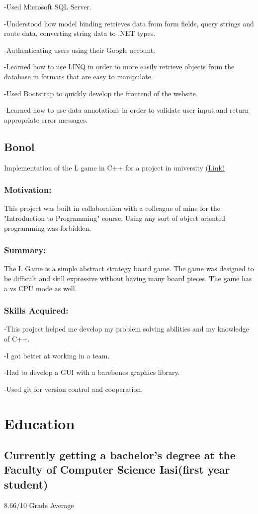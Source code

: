\documentclass[a4paper,hidelinks,12pt]{article}
\begin{document}
-Used Microsoft SQL Server.  

-Understood how model binding retrieves data from form fields, query strings and route data, converting string
data to .NET types.

-Authenticating users using their Google account.

-Learned how to use LINQ in order to more easily retrieve objects from the database in formats that are easy
to manipulate.

-Used Bootstrap to quickly develop the frontend of the website.

-Learned how to use data annotations in order to validate user input and return appropriate error messages.


\subsection{Bonol}
Implementation of the L game in C++ for a project in university \href{https://github.com/IureaMarius/ProiectIP}{(Link)}
\subsubsection{Motivation:}
This project was built in collaboration with a colleague of mine for the "Introduction to Programming" course.
Using any sort of object oriented programming was forbidden.
\subsubsection{Summary:}
The L Game is a simple abstract strategy board game. The game was designed to be difficult and skill expressive
without having many board pieces. The game has a vs CPU mode as well.
\subsubsection{Skills Acquired:}
-This project helped me develop my problem solving abilities and my knowledge of C++.

-I got better at working in a team.

-Had to develop a GUI with a barebones graphics library.

-Used git for version control and cooperation.
\section{Education}
\subsection{Currently getting a bachelor's degree at 
the Faculty of Computer Science Iasi(first year student)}
 8.66/10 Grade Average
\end{document}
